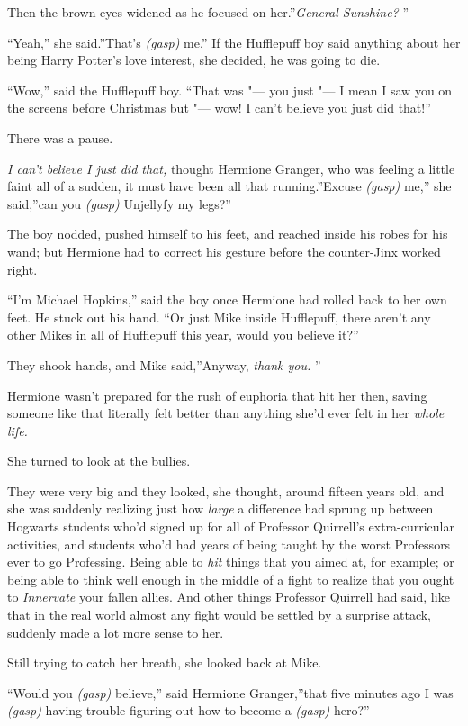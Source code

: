 Then the brown eyes widened as he focused on her.''\emph{General
Sunshine?} ''

``Yeah,'' she said.''That's \emph{(gasp)} me.'' If the Hufflepuff boy
said anything about her being Harry Potter's love interest, she decided,
he was going to die.

``Wow,'' said the Hufflepuff boy. ``That was "--- you just "--- I mean I saw
you on the screens before Christmas but "--- wow! I can't believe you just
did that!''

There was a pause.

\emph{I can't believe I just did that,} thought Hermione Granger, who
was feeling a little faint all of a sudden, it must have been all that
running.''Excuse \emph{(gasp)} me,'' she said,''can you \emph{(gasp)}
Unjellyfy my legs?''

The boy nodded, pushed himself to his feet, and reached inside his robes
for his wand; but Hermione had to correct his gesture before the
counter-Jinx worked right.

``I'm Michael Hopkins,'' said the boy once Hermione had rolled back to
her own feet. He stuck out his hand. ``Or just Mike inside Hufflepuff,
there aren't any other Mikes in all of Hufflepuff this year, would you
believe it?''

They shook hands, and Mike said,''Anyway, \emph{thank you.} ''

Hermione wasn't prepared for the rush of euphoria that hit her then,
saving someone like that literally felt better than anything she'd ever
felt in her \emph{whole life.}

She turned to look at the bullies.

They were very big and they looked, she thought, around fifteen years
old, and she was suddenly realizing just how \emph{large} a difference
had sprung up between Hogwarts students who'd signed up for all of
Professor Quirrell's extra-curricular activities, and students who'd had
years of being taught by the worst Professors ever to go Professing.
Being able to \emph{hit} things that you aimed at, for example; or being
able to think well enough in the middle of a fight to realize that you
ought to \emph{Innervate} your fallen allies. And other things Professor
Quirrell had said, like that in the real world almost any fight would be
settled by a surprise attack, suddenly made a lot more sense to her.

Still trying to catch her breath, she looked back at Mike.

``Would you \emph{(gasp)} believe,'' said Hermione Granger,''that five
minutes ago I was \emph{(gasp)} having trouble figuring out how to
become a \emph{(gasp)} hero?''

